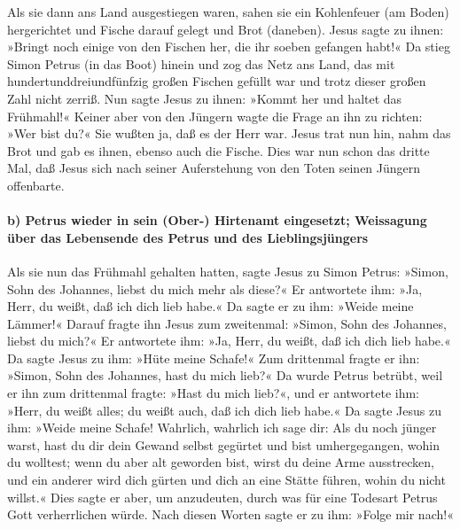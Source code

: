  Als sie dann ans Land ausgestiegen waren, sahen sie ein
Kohlenfeuer (am Boden) hergerichtet und Fische darauf gelegt und Brot
(daneben).  Jesus sagte zu ihnen: »Bringt noch einige von
den Fischen her, die ihr soeben gefangen habt!«  Da stieg
Simon Petrus (in das Boot) hinein und zog das Netz ans Land, das mit
hundertunddreiundfünfzig großen Fischen gefüllt war und trotz dieser
großen Zahl nicht zerriß.  Nun sagte Jesus zu ihnen:
»Kommt her und haltet das Frühmahl!« Keiner aber von den Jüngern wagte
die Frage an ihn zu richten: »Wer bist du?« Sie wußten ja, daß es der
Herr war.  Jesus trat nun hin, nahm das Brot und gab es
ihnen, ebenso auch die Fische.  Dies war nun schon das
dritte Mal, daß Jesus sich nach seiner Auferstehung von den Toten seinen
Jüngern offenbarte.

\hypertarget{b-petrus-wieder-in-sein-ober--hirtenamt-eingesetzt-weissagung-uxfcber-das-lebensende-des-petrus-und-des-lieblingsjuxfcngers}{%
\paragraph{b) Petrus wieder in sein (Ober-) Hirtenamt eingesetzt;
Weissagung über das Lebensende des Petrus und des
Lieblingsjüngers}\label{b-petrus-wieder-in-sein-ober--hirtenamt-eingesetzt-weissagung-uxfcber-das-lebensende-des-petrus-und-des-lieblingsjuxfcngers}}

 Als sie nun das Frühmahl gehalten hatten, sagte Jesus zu
Simon Petrus: »Simon, Sohn des Johannes, liebst du mich mehr als diese?«
Er antwortete ihm: »Ja, Herr, du weißt, daß ich dich lieb habe.« Da
sagte er zu ihm: »Weide meine Lämmer!«  Darauf fragte ihn
Jesus zum zweitenmal: »Simon, Sohn des Johannes, liebst du mich?« Er
antwortete ihm: »Ja, Herr, du weißt, daß ich dich lieb habe.« Da sagte
Jesus zu ihm: »Hüte meine Schafe!«  Zum drittenmal fragte
er ihn: »Simon, Sohn des Johannes, hast du mich lieb?« Da wurde Petrus
betrübt, weil er ihn zum drittenmal fragte: »Hast du mich lieb?«, und er
antwortete ihm: »Herr, du weißt alles; du weißt auch, daß ich dich lieb
habe.« Da sagte Jesus zu ihm: »Weide meine Schafe! 
Wahrlich, wahrlich ich sage dir: Als du noch jünger warst, hast du dir
dein Gewand selbst gegürtet und bist umhergegangen, wohin du wolltest;
wenn du aber alt geworden bist, wirst du deine Arme ausstrecken, und ein
anderer wird dich gürten und dich an eine Stätte führen, wohin du nicht
willst.«  Dies sagte er aber, um anzudeuten, durch was
für eine Todesart Petrus Gott verherrlichen würde. Nach diesen Worten
sagte er zu ihm: »Folge mir nach!«

